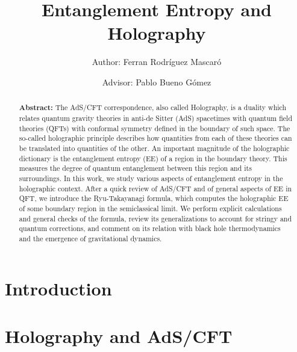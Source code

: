 \documentclass[twocolumn]{revtex4}
\begin{document}
\pagestyle{fancy}


\title{Entanglement Entropy and Holography}
\author{Author: Ferran Rodríguez Mascaró}
\author{Advisor: Pablo Bueno Gómez}


\begin{abstract}
    {\bf Abstract:} The AdS/CFT correspondence, also called Holography, is a duality which relates quantum gravity theories in anti-de Sitter (AdS) spacetimes with quantum field theories (QFTs) with conformal symmetry defined in the boundary of such space. The so-called holographic principle describes how quantities from each of these theories can be translated into quantities of the other. An important magnitude of the holographic dictionary is the entanglement entropy (EE) of a region in the boundary theory. This measures the degree of quantum entanglement between this region and its surroundings. In this work, we study various aspects of entanglement entropy in the holographic context. After a quick review of AdS/CFT and of general aspects of EE in QFT, we introduce the Ryu-Takayanagi formula, which computes the holographic EE of some boundary region in the semiclassical limit. We perform explicit calculations and general checks of the formula, review its generalizations to account for stringy and quantum corrections, and comment on its relation with black hole thermodynamics and the emergence of gravitational dynamics.
\end{abstract}


\maketitle


\section{Introduction} \label{s:Intro}






\newpage


\section{Holography and AdS/CFT}
\end{document}
